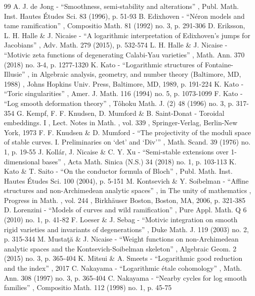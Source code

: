 \documentclass[11pt]{article}
\theoremstyle{definition}
\numberwithin{equation}{subsection}
\begin{document}
\begin{thebibliography}{99}
 A. J. de Jong - “Smoothness, semi-stability and alterations” , Publ. Math. Inst. Hautes Études Sci. 83 (1996), p. 51-93
 B. Edixhoven - “Néron models and tame ramification” , Compositio Math. 81 (1992) no. 3, p. 291-306
 D. Eriksson, L. H. Halle \& J. Nicaise - “A logarithmic interpretation of Edixhoven’s jumps for Jacobians” , Adv. Math. 279 (2015), p. 532-574
 L. H. Halle \& J. Nicaise - “Motivic zeta functions of degenerating Calabi-Yau varieties” , Math. Ann. 370 (2018) no. 3-4, p. 1277-1320
 K. Kato - “Logarithmic structures of Fontaine-Illusie” , in Algebraic analysis, geometry, and number theory (Baltimore, MD, 1988) , Johns Hopkins Univ. Press, Baltimore, MD, 1989, p. 191-224
 K. Kato - “Toric singularities” , Amer. J. Math. 116 (1994) no. 5, p. 1073-1099
 F. Kato - “Log smooth deformation theory” , Tôhoku Math. J. (2) 48 (1996) no. 3, p. 317-354
 G. Kempf, F. F. Knudsen, D. Mumford \& B. Saint-Donat - Toroidal embeddings. I , Lect. Notes in Math. , vol. 339 , Springer-Verlag, Berlin-New York, 1973
 F. F. Knudsen \& D. Mumford - “The projectivity of the moduli space of stable curves. I. Preliminaries on ‘det’ and ‘Div’” , Math. Scand. 39 (1976) no. 1, p. 19-55
 J. Kollár, J. Nicaise \& C. Y. Xu - “Semi-stable extensions over 1-dimensional bases” , Acta Math. Sinica (N.S.) 34 (2018) no. 1, p. 103-113
 K. Kato \& T. Saito - “On the conductor formula of Bloch” , Publ. Math. Inst. Hautes Études Sci. 100 (2004), p. 5-151
 M. Kontsevich \& Y. Soibelman - “Affine structures and non-Archimedean analytic spaces” , in The unity of mathematics , Progress in Math. , vol. 244 , Birkhäuser Boston, Boston, MA, 2006, p. 321-385
 D. Lorenzini - “Models of curves and wild ramification” , Pure Appl. Math. Q 6 (2010) no. 1, p. 41-82
 F. Loeser \& J. Sebag - “Motivic integration on smooth rigid varieties and invariants of degenerations” , Duke Math. J. 119 (2003) no. 2, p. 315-344
 M. Mustaţă \& J. Nicaise - “Weight functions on non-Archimedean analytic spaces and the Kontsevich-Soibelman skeleton” , Algebraic Geom. 2 (2015) no. 3, p. 365-404
 K. Mitsui \& A. Smeets - “Logarithmic good reduction and the index” , 2017
 C. Nakayama - “Logarithmic étale cohomology” , Math. Ann. 308 (1997) no. 3, p. 365-404
 C. Nakayama - “Nearby cycles for log smooth families” , Compositio Math. 112 (1998) no. 1, p. 45-75

\end{thebibliography}
\end{document}
